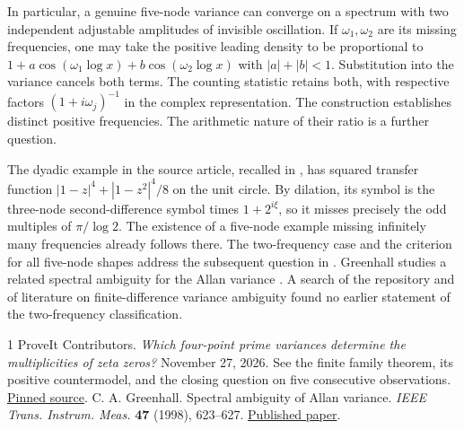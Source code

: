 \documentclass[11pt,letterpaper]{article}
\begin{document}
In particular, a genuine five-node variance can converge on a spectrum with two independent adjustable amplitudes of invisible oscillation. If $\omega_1,\omega_2$ are its missing frequencies, one may take the positive leading density to be proportional to
$1+a\cos(\omega_1\log x)+b\cos(\omega_2\log x)$ with $|a|+|b|<1$. Substitution into the variance cancels both terms. The counting statistic retains both, with respective factors $(1+i\omega_j)^{-1}$ in the complex representation. The construction establishes distinct positive frequencies. The arithmetic nature of their ratio is a further question.

The dyadic example in the source article, recalled in \cite{prior}, has squared transfer function $|1-z|^4+|1-z^2|^4/8$ on the unit circle. By dilation, its symbol is the three-node second-difference symbol times $1+2^{i\xi}$, so it misses precisely the odd multiples of $\pi/\log 2$. The existence of a five-node example missing infinitely many frequencies already follows there. The two-frequency case and the criterion for all five-node shapes address the subsequent question in \cite{prior}. Greenhall studies a related spectral ambiguity for the Allan variance \cite{Greenhall}. A search of the repository and of literature on finite-difference variance ambiguity found no earlier statement of the two-frequency classification.

\begin{thebibliography}{1}
 ProveIt Contributors. \emph{Which four-point prime variances determine the multiplicities of zeta zeros?} November 27, 2026. See the finite family theorem, its positive countermodel, and the closing question on five consecutive observations. \href{https://github.com/VladimirReshetnikov/ProveIt/tree/00cadb961bbe77c74e5d082c4948f8884d58a970/Analysis/GeneralizedRiemannHypothesis/Research/grh-two-open-questions/zero-stencils}{Pinned source}.
 C. A. Greenhall. Spectral ambiguity of Allan variance. \emph{IEEE Trans. Instrum. Meas.} \textbf{47} (1998), 623--627. \href{https://doi.org/10.1109/19.744312}{Published paper}.
\end{thebibliography}
\end{document}
